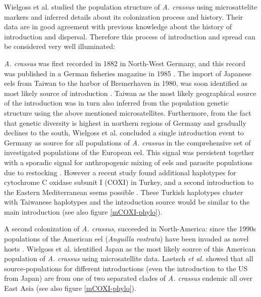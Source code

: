 Wielgoss et al. \cite{wielgoss_population_2008} studied the population
structure of \textit{A. crassus} using microsattelite markers and
inferred details about its colonization process and history. Their
data are in good agreement with previous knowledge about the history
of introduction and dispersal. Therefore this process of introduction
and spread can be considered very well illuminated:


\textit{A. crassus} was first recorded in 1882 in North-West Germany,
and this record was published in a German fisheries magazine in 1985
\cite{fischer_teichwirt}. The import of Japanese eels from Taiwan to
the harbor of Bremerhaven in 1980, was soon identified as most likely
source of introduction
\cite{koops_anguillicola-infestations_1989}. Taiwan as the most likely
geographical source of the introduction was in turn also inferred from
the population genetic structure using the above mentioned
microsatellites. Furthermore, from the fact that genetic diversity is
highest in northern regions of Germany and gradually declines to the
south, Wielgoss et al.  concluded a single introduction event to
Germany as source for all populations of \textit{A. crassus} in the
comprehensive set of investigated populations of the European
eel. This signal was persistent together with a sporadic signal for
anthropogenic mixing of eels and parasite populations due to
restocking \cite{pmid20646147}. However a recent study found
additional haplotypes for cytochrome C oxidase subunit I (COXI) in
Turkey, and a second introduction to the Eastern Mediterranean seems
possible \cite{dl_py}. These Turkish haplotypes cluster with Taiwanese
haplotypes and the introduction source would be similar to the main
introduction (see also figure \ref{mCOXI-phylo}).

A second colonization of \textit{A. crassus}, succeeded in
North-America: since the 1990s populations of the American eel
(\textit{Anguilla rostrata}) have been invaded as novel hosts
\cite{fries_notes:_1996,barse_exotic_1999,
  barse_swimbladder_2001}. Wielgoss et al. identified Japan as the
most likely source of this American population of \textit{A. crassus}
using microsatellite data. Laetsch \textit{et al.} \cite{dl_py} showed
that all source-populations for different introductions (even the
introduction to the US from Japan) are from one of two separated
clades of \textit{A. crassus} endemic all over East Asia (see also
figure \ref{mCOXI-phylo}).

